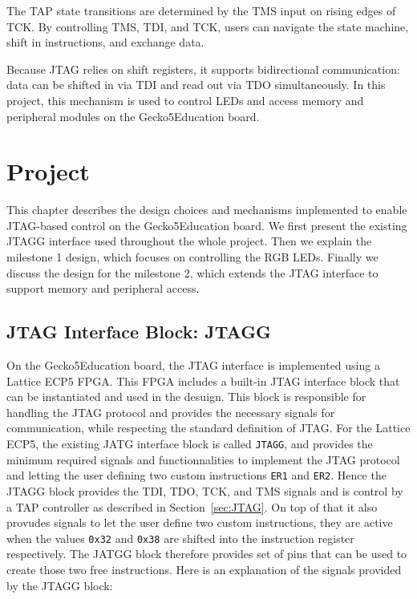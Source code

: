 \documentclass[a4paper,11pt,oneside]{report}
\newcommand{\boardName}{Gecko5Education \xspace}
\begin{document}
The TAP state transitions are determined by the TMS input on rising edges of TCK.  
By controlling TMS, TDI, and TCK, users can navigate the state machine,  
shift in instructions, and exchange data.  

Because JTAG relies on shift registers, it supports bidirectional communication:  
data can be shifted in via TDI and read out via TDO simultaneously.  
In this project, this mechanism is used to control LEDs  
and access memory and peripheral modules on the \boardName board.  


\chapter{Project}
This chapter describes the design choices and mechanisms implemented to enable 
JTAG-based control on the \boardName board.  
We first present the existing JTAGG interface used throughout the whole project.
Then we explain the milestone 1 design, which focuses on controlling the RGB LEDs.  
Finally we discuss the design for the milestone 2, which extends the JTAG interface to support memory and peripheral access.  

\section{JTAG Interface Block: JTAGG}

On the \boardName board, the JTAG interface is implemented using a Lattice ECP5 FPGA. This FPGA includes a built-in JTAG interface block that 
can be instantiated and used in the desuign. This block is responsible for handling the JTAG protocol and provides the necessary signals for communication,
while respecting the standard definition of JTAG.
For the Lattice ECP5, the existing JATG interface block is called \texttt{JTAGG}, and provides the minimum required signals and 
functionnalities to implement the JTAG protocol and letting the user defining two custom instructions \texttt{ER1} and \texttt{ER2}.
Hence the JTAGG block provides the TDI, TDO, TCK, and TMS signals and is control by a TAP controller as described in Section~\ref{sec:JTAG}.
On top of that it also provudes signals to let the user define two custom instructions, they are active when the values \texttt{0x32} and \texttt{0x38} are shifted into the instruction register respectively.
The JATGG block therefore provides set of pins that can be used to create those two free instructions.
Here is an explanation of the signals provided by the JTAGG block:
\end{document}
